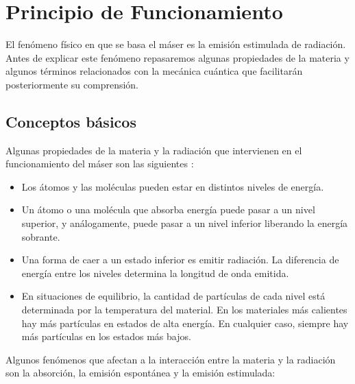 \section{Principio de Funcionamiento}
\label{principio}

El fen\'omeno f\'isico en que se basa el m\'aser es la emisi\'on estimulada de radiaci\'on. Antes de explicar este fen\'omeno repasaremos algunas propiedades de la materia y algunos t\'erminos relacionados con la mec\'anica cu\'antica que facilitar\'an posteriormente su comprensi\'on.

\subsection{Conceptos b\'asicos}

Algunas propiedades de la materia y la radiaci\'on que intervienen en el funcionamiento del m\'aser son las siguientes \cite{maserEspacio}:

\begin{itemize}
 \item Los \'atomos y las mol\'eculas pueden estar en distintos niveles de energ\'ia.
 \item Un \'atomo o una mol\'ecula que absorba energ\'ia puede pasar a un nivel superior, y an\'alogamente, puede pasar a un nivel inferior liberando la energ\'ia sobrante.
 \item Una forma de caer a un estado inferior es emitir radiaci\'on. La diferencia de energ\'ia entre los niveles determina la longitud de onda emitida. 
 \item En situaciones de equilibrio, la cantidad de part\'iculas de cada nivel est\'a determinada por la temperatura del material. En los materiales m\'as calientes hay m\'as part\'iculas en estados de alta energ\'ia. En cualquier caso, siempre hay m\'as part\'iculas en los estados m\'as bajos.
\end{itemize}

Algunos fen\'omenos que afectan a la interacci\'on entre la materia y la radiaci\'on son la absorci\'on, la emisi\'on espont\'anea y la emisi\'on estimulada:

